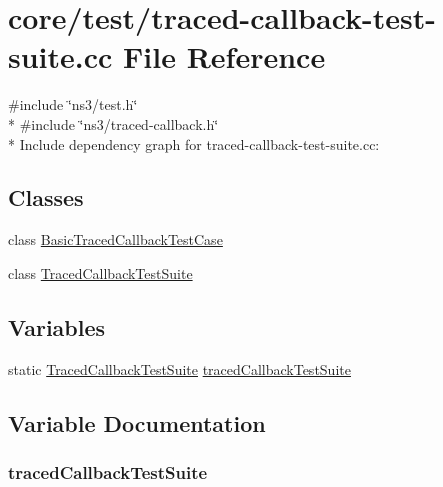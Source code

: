 \hypertarget{traced-callback-test-suite_8cc}{}\section{core/test/traced-\/callback-\/test-\/suite.cc File Reference}
\label{traced-callback-test-suite_8cc}
{\ttfamily \#include \char`\"{}ns3/test.\+h\char`\"{}}\\*
{\ttfamily \#include \char`\"{}ns3/traced-\/callback.\+h\char`\"{}}\\*
Include dependency graph for traced-\/callback-\/test-\/suite.cc\+:
\subsection*{Classes}
\begin{DoxyCompactItemize}
\item 
class \hyperlink{classBasicTracedCallbackTestCase}{Basic\+Traced\+Callback\+Test\+Case}
\item 
class \hyperlink{classTracedCallbackTestSuite}{Traced\+Callback\+Test\+Suite}
\end{DoxyCompactItemize}
\subsection*{Variables}
\begin{DoxyCompactItemize}
\item 
static \hyperlink{classTracedCallbackTestSuite}{Traced\+Callback\+Test\+Suite} \hyperlink{traced-callback-test-suite_8cc_a397c7edbd3cea061016f09990b6cd847}{traced\+Callback\+Test\+Suite}
\end{DoxyCompactItemize}


\subsection{Variable Documentation}
\subsubsection[{\texorpdfstring{traced\+Callback\+Test\+Suite}{tracedCallbackTestSuite}}]{ traced\+Callback\+Test\+Suite\hspace{0.3cm}{\ttfamily [static]}}\hypertarget{traced-callback-test-suite_8cc_a397c7edbd3cea061016f09990b6cd847}{}\label{traced-callback-test-suite_8cc_a397c7edbd3cea061016f09990b6cd847}
